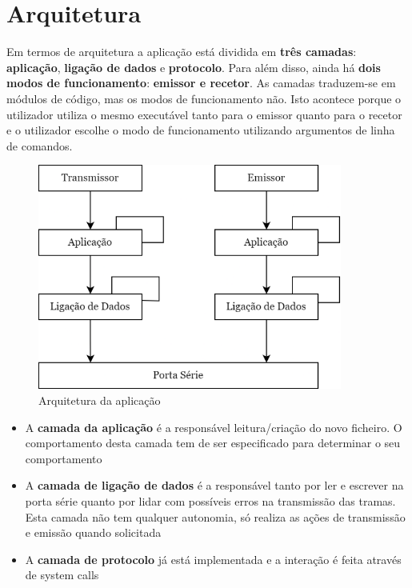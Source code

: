\section{Arquitetura}
Em termos de arquitetura a aplicação está dividida em \textbf{três camadas}: \textbf{aplicação}, \textbf{ligação de dados} e \textbf{protocolo}. Para além disso, ainda há \textbf{dois modos de funcionamento}: \textbf{emissor e recetor}. As camadas traduzem-se em módulos de código, mas os modos de funcionamento não. Isto acontece porque o utilizador utiliza o mesmo executável tanto para o emissor quanto para o recetor e o utilizador escolhe o modo de funcionamento utilizando argumentos de linha de comandos. 

\begin{figure}[h!]
    \centering
    \includegraphics[width=10cm]{img/pic.png}    
    \caption{Arquitetura da aplicação}
\end{figure}

\begin{itemize}
    \item A \textbf{camada da aplicação} é a responsável leitura/criação do novo ficheiro. O comportamento desta camada tem de ser especificado para determinar o seu comportamento
    \item A \textbf{camada de ligação de dados} é a responsável tanto por ler e escrever na porta série quanto por lidar com possíveis erros na transmissão das tramas. Esta camada não tem qualquer autonomia, só realiza as ações de transmissão e emissão quando solicitada
    \item A \textbf{camada de protocolo} já está implementada e a interação é feita através de system calls
\end{itemize}
